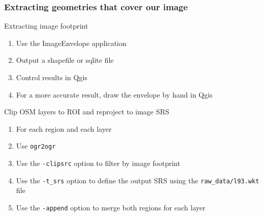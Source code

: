 \documentclass[8pt]{beamer}
\begin{document}
\begin{frame}[fragile]
\frametitle{Extracting geometries that cover our image}
\begin{block}{Extracting image footprint}
\begin{enumerate}
\item Use the ImageEnvelope application
\item Output a shapefile or sqlite file
\item Control results in Qgis
\item For a more accurate result, draw the envelope by hand in Qgis
\end{enumerate}
\end{block}

\begin{block}{Clip OSM layers to ROI and reproject to image SRS}
\begin{enumerate}
\item For each region and each layer
\item Use \texttt{ogr2ogr}
\item Use the \texttt{-clipsrc} option to filter by image footprint
\item Use the \texttt{-t\_srs} option to define the output SRS using the \texttt{raw\_data/l93.wkt} file
\item Use the \texttt{-append} option to merge both regions for each layer
\end{enumerate}
\end{block}

\end{frame}
\end{document}
